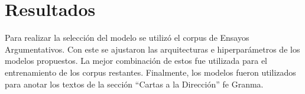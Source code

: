 \documentclass[a4paper,11pt,twocolumn,twoside]{article}
\begin{document}




\section{Resultados}

Para realizar la selección del modelo se utilizó el corpus de Ensayos Argumentativos. Con este se ajustaron
las arquitecturas e hiperparámetros de los modelos propuestos. La mejor combinación de estos fue utilizada 
para el entrenamiento de los corpus restantes. Finalmente, los modelos fueron utilizados para anotar los 
textos de la sección ``Cartas a la Dirección'' fe Granma. 
\end{document}
